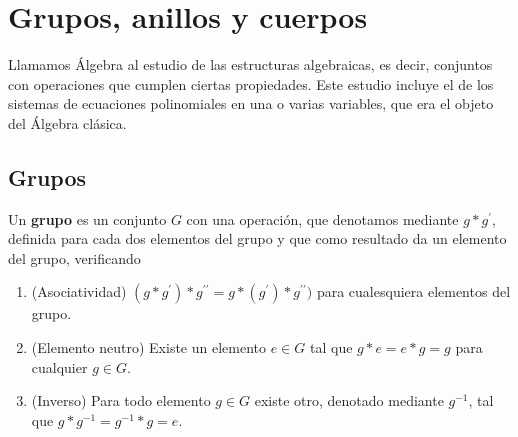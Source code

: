 \section{Grupos, anillos y cuerpos}

Llamamos \'Algebra al estudio de las estructuras algebraicas, es decir, conjuntos con operaciones que cumplen ciertas propiedades. Este estudio incluye el de los sistemas de  ecuaciones polinomiales en una o varias variables, que era el objeto del   \'Algebra cl\'asica. 


\subsection{Grupos}
Un {\bf grupo} es un conjunto $G$ con una operaci\'on, que denotamos mediante $g*g^{\prime}$,  definida para cada dos elementos del grupo y que como resultado da un elemento del grupo, verificando 
\begin{enumerate}
	\item (Asociatividad) $(g*g^{\prime})*g^{\prime\prime}=g*(g^{\prime})*g^{\prime\prime})$ para cualesquiera elementos del grupo.
	\item (Elemento neutro) Existe un elemento $e\in G$ tal que $g*e=e*g=g$ para cualquier $g\in G.$
	\item (Inverso) Para todo elemento $g\in G$ existe otro, denotado mediante $g^{-1}$, tal que $g*g^{-1}=g^{-1}*g=e$.
	\end{enumerate}
	
